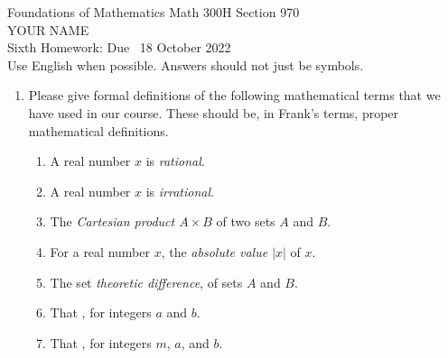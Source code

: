 \documentclass[12pt]{article}
\newcommand{\defcolor}[1]{{\color{blue}{#1}}}
\newcommand{\demph}[1]{{\color{blue}\sl{#1}}}
\begin{document}
\LARGE 
\noindent
{\color{Maroon}Foundations of Mathematics \hfill Math 300H Section 970}\vspace{2pt}\\
\Large YOUR NAME\vspace{2pt}\\
\large
Sixth Homework: \hfill Due \  18 October 2022\\
Use English when possible.  Answers should not just be symbols.
\normalsize\smallskip




\noindent{\color{blue}\rule{500pt}{2pt}}\smallskip

\begin{enumerate}  %


\item Please give formal definitions of the following mathematical terms that we have used in our course.
  These should be, in Frank's terms, proper mathematical definitions.
  
  \begin{enumerate}
    \item  A real number $x$ is \demph{rational}.

    \item A real number $x$ is \demph{irrational}.

    \item The \demph{Cartesian product $A\times B$} of two sets $A$ and $B$.

    \item For a real number $x$, the \demph{absolute value $|x|$} of $x$.

    \item The set \demph{theoretic difference}, \defcolor{$A-B$} of sets $A$ and $B$.
      
    \item That \defcolor{$a |b$}, for integers $a$ and $b$.

    \item That \defcolor{$a\equiv b \mod m$}, for integers $m$, $a$, and $b$.
      
\end{enumerate}

  


\end{enumerate}
\end{document}
